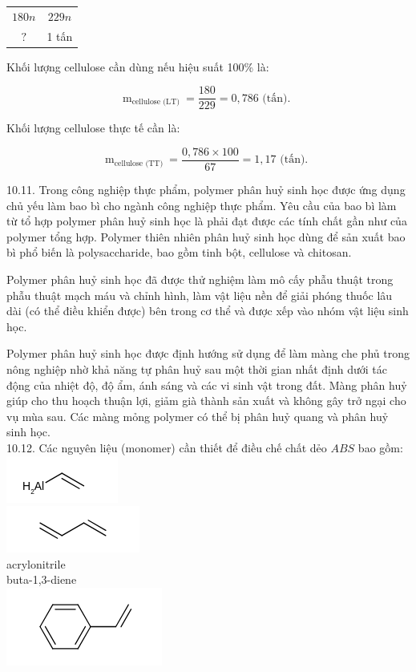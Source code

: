 \documentclass[10pt]{article}
\begin{document}
\begin{center}
\begin{tabular}{cc}
$180 n$ & $229 n$ \\
$?$ & 1 tấn \\
\end{tabular}
\end{center}

Khối lượng cellulose cần dùng nếu hiệu suất 100\% là:

$$
\mathrm{m}_{\text {cellulose (LT) }}=\frac{180}{229}=0,786 \text { (tấn). }
$$

Khối lượng cellulose thực tế cần là:

$$
\mathrm{m}_{\text {cellulose (TT) }}=\frac{0,786 \times 100}{67}=1,17 \text { (tấn). }
$$

10.11. Trong công nghiệp thực phẩm, polymer phân huỷ sinh học được ứng dụng chủ yếu làm bao bì cho ngành công nghiệp thực phẩm. Yêu cầu của bao bì làm từ tổ hợp polymer phân huỷ sinh học là phải đạt được các tính chất gần như của polymer tổng hợp. Polymer thiên nhiên phân huỷ sinh học dùng để sản xuất bao bì phổ biến là polysaccharide, bao gồm tinh bột, cellulose và chitosan.

Polymer phân huỷ sinh học đã được thử nghiệm làm mô cấy phẫu thuật trong phẫu thuật mạch máu và chỉnh hình, làm vật liệu nền để giải phóng thuốc lâu dài (có thể điều khiển được) bên trong cơ thể và được xếp vào nhóm vật liệu sinh học.

Polymer phân huỷ sinh học được định hướng sử dụng để làm màng che phủ trong nông nghiệp nhờ khả năng tự phân huỷ sau một thời gian nhất định dưới tác động của nhiệt độ, độ ẩm, ánh sáng và các vi sinh vật trong đất. Màng phân huỷ giúp cho thu hoạch thuận lợi, giảm già thành sản xuất và không gây trở ngại cho vụ mùa sau. Các màng mỏng polymer có thể bị phân huỷ quang và phân huỷ sinh học.\\
10.12. Các nguyên liệu (monomer) cần thiết để điều chế chất dẻo $A B S$ bao gồm:\\
\includegraphics{smile-deb1c1ac46675842b2597b3f35d65be0ac5ccec2}\\
\includegraphics{smile-466750c297c9a95104425c35c4395164e4867082}\\
acrylonitrile\\
buta-1,3-diene\\
\includegraphics{smile-1f719329abc2a0bd2f4624d960469e678637df80}
\end{document}
